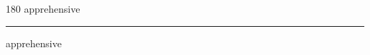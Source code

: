 
\begin{frame}
\begin{center}
\begin{turn}{180}
{\fontsize{2.5cm}{1em}\selectfont apprehensive}
\end{turn}
\vspace{1em}\par  
\hrule
\vspace{1em}\par  
{\fontsize{2.5cm}{1em}\selectfont apprehensive}
\end{center}
\end{frame}
